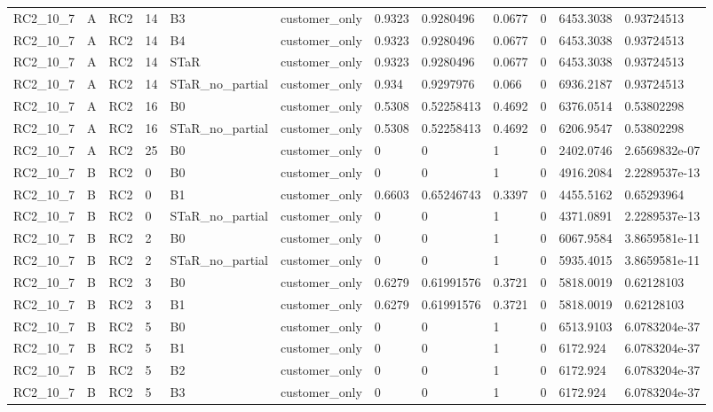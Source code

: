 \begin{longtable}{llllllllllll}
RC2\_10\_7 & A & RC2 & 14 & B3 & customer\_only & 0.9323 & 0.9280496 & 0.0677 & 0 & 6453.3038 & 0.93724513 \\
RC2\_10\_7 & A & RC2 & 14 & B4 & customer\_only & 0.9323 & 0.9280496 & 0.0677 & 0 & 6453.3038 & 0.93724513 \\
RC2\_10\_7 & A & RC2 & 14 & STaR & customer\_only & 0.9323 & 0.9280496 & 0.0677 & 0 & 6453.3038 & 0.93724513 \\
RC2\_10\_7 & A & RC2 & 14 & STaR\_no\_partial & customer\_only & 0.934 & 0.9297976 & 0.066 & 0 & 6936.2187 & 0.93724513 \\
RC2\_10\_7 & A & RC2 & 16 & B0 & customer\_only & 0.5308 & 0.52258413 & 0.4692 & 0 & 6376.0514 & 0.53802298 \\
RC2\_10\_7 & A & RC2 & 16 & STaR\_no\_partial & customer\_only & 0.5308 & 0.52258413 & 0.4692 & 0 & 6206.9547 & 0.53802298 \\
RC2\_10\_7 & A & RC2 & 25 & B0 & customer\_only & 0 & 0 & 1 & 0 & 2402.0746 & 2.6569832e-07 \\
RC2\_10\_7 & B & RC2 & 0 & B0 & customer\_only & 0 & 0 & 1 & 0 & 4916.2084 & 2.2289537e-13 \\
RC2\_10\_7 & B & RC2 & 0 & B1 & customer\_only & 0.6603 & 0.65246743 & 0.3397 & 0 & 4455.5162 & 0.65293964 \\
RC2\_10\_7 & B & RC2 & 0 & STaR\_no\_partial & customer\_only & 0 & 0 & 1 & 0 & 4371.0891 & 2.2289537e-13 \\
RC2\_10\_7 & B & RC2 & 2 & B0 & customer\_only & 0 & 0 & 1 & 0 & 6067.9584 & 3.8659581e-11 \\
RC2\_10\_7 & B & RC2 & 2 & STaR\_no\_partial & customer\_only & 0 & 0 & 1 & 0 & 5935.4015 & 3.8659581e-11 \\
RC2\_10\_7 & B & RC2 & 3 & B0 & customer\_only & 0.6279 & 0.61991576 & 0.3721 & 0 & 5818.0019 & 0.62128103 \\
RC2\_10\_7 & B & RC2 & 3 & B1 & customer\_only & 0.6279 & 0.61991576 & 0.3721 & 0 & 5818.0019 & 0.62128103 \\
RC2\_10\_7 & B & RC2 & 5 & B0 & customer\_only & 0 & 0 & 1 & 0 & 6513.9103 & 6.0783204e-37 \\
RC2\_10\_7 & B & RC2 & 5 & B1 & customer\_only & 0 & 0 & 1 & 0 & 6172.924 & 6.0783204e-37 \\
RC2\_10\_7 & B & RC2 & 5 & B2 & customer\_only & 0 & 0 & 1 & 0 & 6172.924 & 6.0783204e-37 \\
RC2\_10\_7 & B & RC2 & 5 & B3 & customer\_only & 0 & 0 & 1 & 0 & 6172.924 & 6.0783204e-37 \\

\end{longtable}
